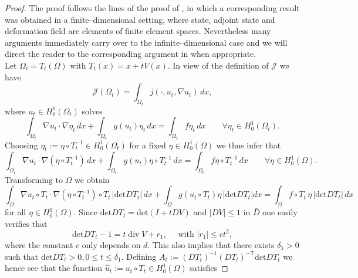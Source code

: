 \documentclass[10pt,a4paper]{amsart}
\DeclareMathOperator{\Div}{div}
\newcommand{\dx}{\,dx}
\begin{document}
\begin{proof}
The proof follows the lines of the proof of \cite[Lemma 3.2]{DHH25-convergence}, in which
a corresponding result was obtained in a finite--dimensional setting, where
state, adjoint state and deformation field are elements of finite element spaces. 
Nevertheless many arguments immediately carry over to the infinite--dimensional case and
we will direct the reader to the corresponding argument in \cite{DHH25-convergence}
when appropriate. \\
Let $\Omega_t=T_t(\Omega)$ with $T_t(x)=x+t V(x)$. In view of the definition of $\mathcal J$
we have
\begin{displaymath}
\mathcal J(\Omega_t) = \int_{\Omega_t} j(\cdot,u_t,\nabla u_t)  \dx,
\end{displaymath}
where $u_t \in H^1_0(\Omega_t)$ solves
\begin{displaymath}  
\int_{\Omega_t} \nabla u_t \cdot \nabla \eta_t  \dx + \int_{\Omega_t} g(u_t) \eta_t \dx = \int_{\Omega_t} f \eta_t  \dx \qquad \forall \eta_t \in H^1_0(\Omega_t).
\end{displaymath}
Choosing $\eta_t:= \eta \circ T_t^{-1} \in H^1_0(\Omega_t)$ for a fixed $\eta \in H^1_0(\Omega)$ we thus infer that 
\begin{equation}  \label{hatuht}
\int_{\Omega_t} \nabla u_t \cdot \nabla (\eta \circ T_t^{-1})  \dx + \int_{\Omega_t} g(u_t) \eta \circ T_t^{-1} \dx = \int_{\Omega_t} f \eta \circ T_t^{-1}  \dx \qquad
\forall  \eta \in H^1_0(\Omega).
\end{equation}
Transforming to $\Omega$ we obtain
\begin{equation} \label{uhtrel}
\int_{\Omega} \nabla u_t \circ T_t \cdot \nabla (\eta \circ T_t^{-1}) \circ T_t \, | \mbox{det} D T_t |  \dx + \int_{\Omega} g(u_t\circ T_t) \eta \, | \mbox{det} D T_t |dx =
\int_{\Omega} f \circ T_t \, \eta \, | \mbox{det} D T_t |  \dx 
\end{equation}
for all $\eta \in H^1_0(\Omega)$. Since $\mbox{det} DT_t = \mbox{det}(I+ t DV)$ and $| D V | \leq 1$ in $\bar D$ one easily
verifies that 
\begin{equation} \label{dif1}
\mbox{det} DT_t -1 = t {\Div} V + r_1, \quad \mbox{ with } | r_1 | \leq c t^2,
\end{equation}
where the constant $c$ only depends on $d$. This also implies that  there exists $\delta_1>0$ such
that $\mbox{det} DT_t >0, 0 \leq t \leq \delta_1$. Defining $A_t:= (DT_t)^{-1} (D T_t)^{- \mathsf{T}} \mbox{det} DT_t$ we hence see that the function
$\hat u_t:= u_t \circ T_t \in H^1_0(\Omega)$ satisfies

\end{proof}
\end{document}

